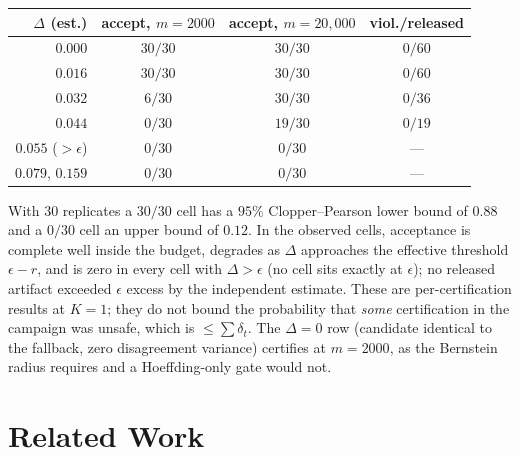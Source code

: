 \documentclass[conference]{IEEEtran}
\begin{document}
\begin{center}\small
\begin{tabular}{rccc}
\toprule
$\Delta$ (est.) & accept, $m{=}2000$ & accept, $m{=}20{,}000$ & viol./released \\
\midrule
$0.000$ & $30/30$ & $30/30$ & $0/60$ \\
$0.016$ & $30/30$ & $30/30$ & $0/60$ \\
$0.032$ & $6/30$ & $30/30$ & $0/36$ \\
$0.044$ & $0/30$ & $19/30$ & $0/19$ \\
$0.055$ ($>\epsilon$) & $0/30$ & $0/30$ & --- \\
$0.079$, $0.159$ & $0/30$ & $0/30$ & --- \\
\bottomrule
\end{tabular}
\end{center}

With 30 replicates a $30/30$ cell has a $95\%$ Clopper--Pearson lower
bound of $0.88$ and a $0/30$ cell an upper bound of $0.12$. In the observed cells, acceptance is complete well inside the budget,
degrades as $\Delta$ approaches the effective threshold $\epsilon-r$,
and is zero in every cell with $\Delta>\epsilon$ (no cell sits exactly
at $\epsilon$); no released artifact exceeded $\epsilon$ excess by the
independent estimate. These are per-certification results at $K{=}1$;
they do not bound the probability that \emph{some} certification in
the campaign was unsafe, which is $\le\sum\delta_t$. The $\Delta{=}0$ row (candidate identical to the
fallback, zero disagreement variance) certifies at $m=2000$, as the
Bernstein radius requires and a Hoeffding-only gate would not.

\section{Related Work}
\end{document}
